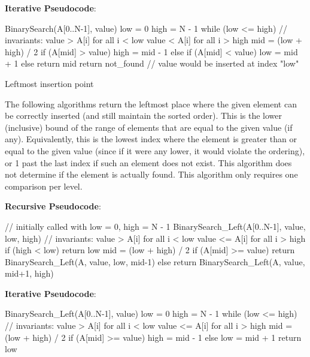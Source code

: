 \textbf{Iterative Pseudocode}:

\begin{wideverbatim}
  BinarySearch(A[0..N-1], value) {
      low = 0
      high = N - 1
      while (low <= high) {
          // invariants: value > A[i] for all i < low
                         value < A[i] for all i > high
          mid = (low + high) / 2
          if (A[mid] > value)
              high = mid - 1
          else if (A[mid] < value)
              low = mid + 1
          else
              return mid
      }
      return not_found // value would be inserted at index "low"
  }
\end{wideverbatim}

Leftmost insertion point

The following algorithms return the leftmost place where the given
element can be correctly inserted (and still maintain the sorted order).
This is the lower (inclusive) bound of the range of elements that are
equal to the given value (if any). Equivalently, this is the lowest
index where the element is greater than or equal to the given value
(since if it were any lower, it would violate the ordering), or 1 past
the last index if such an element does not exist. This algorithm does
not determine if the element is actually found. This algorithm only
requires one comparison per level.

\textbf{Recursive Pseudocode}:

\begin{wideverbatim}
  // initially called with low = 0, high = N - 1
  BinarySearch_Left(A[0..N-1], value, low, high) {
      // invariants: value > A[i] for all i < low
                     value <= A[i] for all i > high
      if (high < low)
          return low
      mid = (low + high) / 2
      if (A[mid] >= value)
          return BinarySearch_Left(A, value, low, mid-1)
      else
          return BinarySearch_Left(A, value, mid+1, high)
  }
\end{wideverbatim}

\textbf{Iterative Pseudocode}:

\begin{wideverbatim}
  BinarySearch_Left(A[0..N-1], value) {
      low = 0
      high = N - 1
      while (low <= high) {
          // invariants: value > A[i] for all i < low
                         value <= A[i] for all i > high
          mid = (low + high) / 2
          if (A[mid] >= value)
              high = mid - 1
          else
              low = mid + 1
      }
      return low
  }
\end{wideverbatim}

